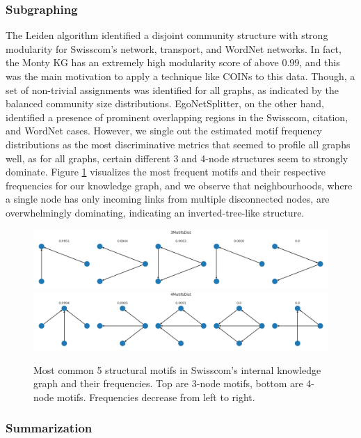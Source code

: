 \subsubsection{Subgraphing} The Leiden algorithm identified a disjoint community structure with strong modularity for Swisscom's network, transport, and WordNet networks. In fact, the Monty KG has an extremely high modularity score of above 0.99, and this was the main motivation to apply a technique like COINs to this data. Though, a set of non-trivial assignments was identified for all graphs, as indicated by the balanced community size distributions. EgoNetSplitter, on the other hand, identified a presence of prominent overlapping regions in the Swisscom, citation, and WordNet cases. However, we single out the estimated motif frequency distributions as the most discriminative metrics that seemed to profile all graphs well, as for all graphs, certain different 3 and 4-node structures seem to strongly dominate. Figure \ref{fig:motifs} visualizes the most frequent motifs and their respective frequencies for our knowledge graph, and we observe that neighbourhoods, where a single node has only incoming links from multiple disconnected nodes, are overwhelmingly dominating, indicating an inverted-tree-like structure.

\begin{figure}[H]
    \centering
    \includegraphics[width=\textwidth]{figures/swisscom/3motifs.png}
    \includegraphics[width=\textwidth]{figures/swisscom/4motifs.png}
    \caption[Most common 5 structural motifs in Swisscom's internal knowledge graph and their frequencies.]{Most common 5 structural motifs in Swisscom's internal knowledge graph and their frequencies. Top are 3-node motifs, bottom are 4-node motifs. Frequencies decrease from left to right.}
    \label{fig:motifs}
\end{figure}

\subsubsection{Summarization}

